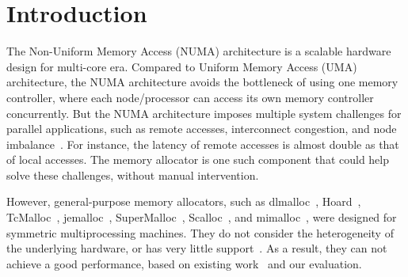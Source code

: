 
\section{Introduction}
\label{sec:intro}

The Non-Uniform Memory Access (NUMA) architecture is a scalable hardware design for multi-core era. Compared to Uniform Memory Access (UMA) architecture, the NUMA architecture avoids the bottleneck of using one memory controller, where each node/processor can access its own memory controller concurrently. But the NUMA architecture imposes multiple system challenges for parallel applications, such as remote accesses, interconnect congestion, and node imbalance~\cite{Blagodurov:2011:CNC:2002181.2002182}. For instance, the latency of remote accesses is almost double as that of local accesses. The memory allocator is one such component that could help solve these challenges, without manual intervention.   

However, general-purpose memory allocators, such as dlmalloc~\cite{dlmalloc},  Hoard~\cite{Hoard}, TcMalloc~\cite{tcmalloc}, jemalloc~\cite{jemalloc}, SuperMalloc~\cite{supermalloc}, Scalloc~\cite{Scalloc}, and mimalloc~\cite{mimalloc}, were designed for symmetric multiprocessing machines. They do not consider the heterogeneity of the underlying hardware, or has very little support~\cite{mimalloc}. As a result, they can not achieve a good performance, based on existing work~\cite{tcmallocnew, yang2019jarena} and our evaluation. 

